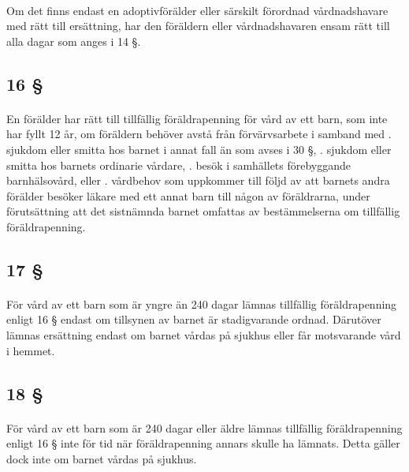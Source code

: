 \documentclass[a4paper,notitlepage,openany,10pt]{book}
\begin{document}
\paragraph*{}
Om det finns endast en adoptivförälder eller särskilt förordnad vårdnadshavare med rätt till ersättning, har den föräldern eller vårdnadshavaren ensam rätt till alla dagar som anges i 14 §.
\subsection*{16 §}
\paragraph*{}
En förälder har rätt till tillfällig föräldrapenning för vård av ett barn, som inte har fyllt 12 år, om föräldern behöver avstå från förvärvsarbete i samband med
. sjukdom eller smitta hos barnet i annat fall än som avses i 30 §,
. sjukdom eller smitta hos barnets ordinarie vårdare,
. besök i samhällets förebyggande barnhälsovård, eller
. vårdbehov som uppkommer till följd av att barnets andra förälder besöker läkare med ett annat barn till någon av föräldrarna, under förutsättning att det sistnämnda barnet omfattas av bestämmelserna om tillfällig föräldrapenning.
\subsection*{17 §}
\paragraph*{}
För vård av ett barn som är yngre än 240 dagar lämnas tillfällig föräldrapenning enligt 16 § endast om tillsynen av barnet är stadigvarande ordnad. Därutöver lämnas ersättning endast om barnet vårdas på sjukhus eller får motsvarande vård i hemmet.
\subsection*{18 §}
\paragraph*{}
För vård av ett barn som är 240 dagar eller äldre lämnas tillfällig föräldrapenning enligt 16 § inte för tid när föräldrapenning annars skulle ha lämnats. Detta gäller dock inte om barnet vårdas på sjukhus.
\end{document}
